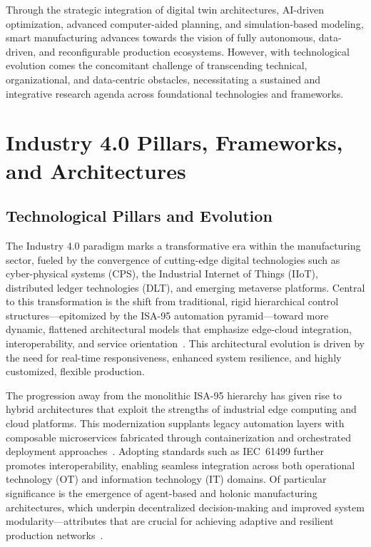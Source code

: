 \documentclass[sigconf]{acmart}
\begin{document}
Through the strategic integration of digital twin architectures, AI-driven optimization, advanced computer-aided planning, and simulation-based modeling, smart manufacturing advances towards the vision of fully autonomous, data-driven, and reconfigurable production ecosystems. However, with technological evolution comes the concomitant challenge of transcending technical, organizational, and data-centric obstacles, necessitating a sustained and integrative research agenda across foundational technologies and frameworks.

\section{Industry 4.0 Pillars, Frameworks, and Architectures}

\subsection{Technological Pillars and Evolution}

The Industry 4.0 paradigm marks a transformative era within the manufacturing sector, fueled by the convergence of cutting-edge digital technologies such as cyber-physical systems (CPS), the Industrial Internet of Things (IIoT), distributed ledger technologies (DLT), and emerging metaverse platforms. Central to this transformation is the shift from traditional, rigid hierarchical control structures—epitomized by the ISA-95 automation pyramid—toward more dynamic, flattened architectural models that emphasize edge-cloud integration, interoperability, and service orientation~\cite{ref1,ref9,ref11,ref16,ref18,ref27,ref30,ref37,ref38,ref44,ref45,ref57,ref59}. This architectural evolution is driven by the need for real-time responsiveness, enhanced system resilience, and highly customized, flexible production.

The progression away from the monolithic ISA-95 hierarchy has given rise to hybrid architectures that exploit the strengths of industrial edge computing and cloud platforms. This modernization supplants legacy automation layers with composable microservices fabricated through containerization and orchestrated deployment approaches~\cite{ref1}. Adopting standards such as IEC~61499 further promotes interoperability, enabling seamless integration across both operational technology (OT) and information technology (IT) domains. Of particular significance is the emergence of agent-based and holonic manufacturing architectures, which underpin decentralized decision-making and improved system modularity—attributes that are crucial for achieving adaptive and resilient production networks~\cite{ref11,ref37}.
\end{document}
